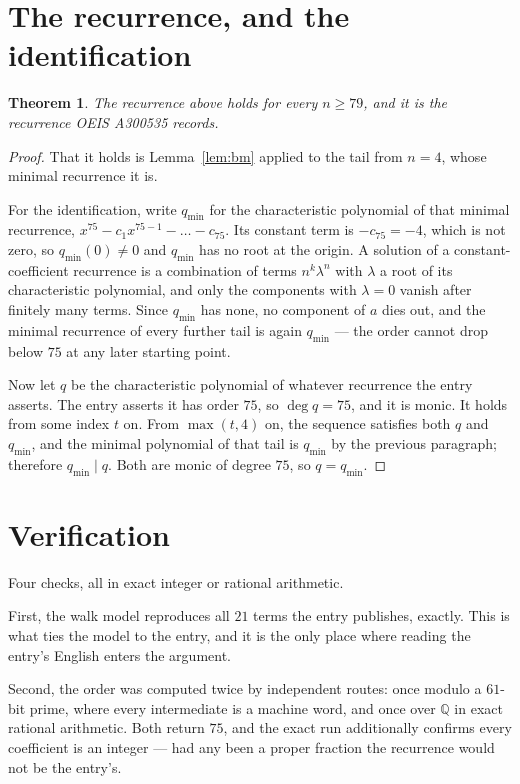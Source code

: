 \documentclass[11pt,a4paper]{article}
\theoremstyle{plain}
\newtheorem{theorem}{Theorem}
\theoremstyle{definition}
\begin{document}
\section{The recurrence, and the identification}

\begin{theorem}
The recurrence above holds for every $n\ge79$, and it is the recurrence OEIS A300535 records.
\end{theorem}

\begin{proof}
That it holds is Lemma~\ref{lem:bm} applied to the tail from $n=4$, whose minimal
recurrence it is.

For the identification, write $q_{\min}$ for the characteristic polynomial of that minimal
recurrence, $x^{75}-c_1x^{75-1}-\dots-c_{75}$. Its constant term is
$-c_{75}=-4$, which is not zero, so $q_{\min}(0)\neq0$ and $q_{\min}$ has no
root at the origin. A solution of a constant-coefficient recurrence is a combination of terms
$n^{k}\lambda^{n}$ with $\lambda$ a root of its characteristic polynomial, and only the
components with $\lambda=0$ vanish after finitely many terms. Since $q_{\min}$ has none, no
component of $a$ dies out, and the minimal recurrence of every further tail is again
$q_{\min}$ --- the order cannot drop below $75$ at any later starting point.

Now let $q$ be the characteristic polynomial of whatever recurrence the entry asserts. The
entry asserts it has order $75$, so $\deg q=75$, and it is monic. It holds from some
index $t$ on. From $\max(t,4)$ on, the sequence satisfies both $q$ and $q_{\min}$, and
the minimal polynomial of that tail is $q_{\min}$ by the previous paragraph; therefore
$q_{\min}\mid q$. Both are monic of degree $75$, so $q=q_{\min}$.
\end{proof}

\section{Verification}

Four checks, all in exact integer or rational arithmetic.

First, the walk model reproduces all $21$ terms the entry publishes, exactly. This is
what ties the model to the entry, and it is the only place where reading the entry's English
enters the argument.

Second, the order was computed twice by independent routes: once modulo a $61$-bit prime, where
every intermediate is a machine word, and once over $\mathbb{Q}$ in exact rational arithmetic.
Both return $75$, and the exact run additionally confirms every coefficient is an integer
--- had any been a proper fraction the recurrence would not be the entry's.
\end{document}
